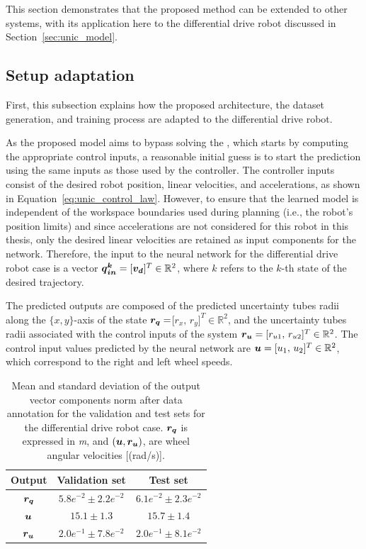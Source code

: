 This section demonstrates that the proposed method can be extended to other systems, with its application here to the differential drive robot discussed in Section~\ref{sec:unic_model}.

\subsection{Setup adaptation}\label{sec:setup_adaptation}

First, this subsection explains how the proposed architecture, the dataset generation, and training process are adapted to the differential drive robot.

As the proposed model aims to bypass solving the , which starts by computing the appropriate control inputs, a reasonable initial guess is to start the prediction using the same inputs as those used by the controller.
The  controller inputs consist of the desired robot position, linear velocities, and accelerations, as shown in Equation~\ref{eq:unic_control_law}. 
However, to ensure that the learned model is independent of the workspace boundaries used during planning (i.e., the robot's position limits) and since accelerations are not considered for this robot in this thesis, only the desired linear velocities are retained as input components for the network.
Therefore, the input to the neural network for the differential drive robot case is a vector $\boldsymbol{\boldsymbol{q}_{in}^k} = [\boldsymbol{v_d}]^T \in \mathbb{R}^2$, where $k$ refers to the $k$-th state of the desired trajectory.

The predicted outputs are composed of the predicted uncertainty tubes radii along the $\{x,y\}$-axis of the state $\boldsymbol{r_q}=$[$r_{x},\,r_{y}]^T \in \mathbb{R}^2$, and the uncertainty tubes radii associated with the control inputs of the system $\boldsymbol{r_u} = [r_{u1},\,r_{u2}]^T \in \mathbb{R}^2$.
The control input values predicted by the neural network are $\boldsymbol{u} = [u_1 ,\, u_2]^T \in \mathbb{R}^2$, which correspond to the right and left wheel speeds.

\begin{table}[htp]
    \centering
    \begin{tabular}{ | c | c || c |}
    \hline
      \textbf{Output}  & \textbf{Validation set}  & \textbf{Test set} \\ \hline
    $\boldsymbol{r_q}$ & $5.8e^{-2} \pm 2.2e^{-2}$ & $6.1e^{-2} \pm 2.3e^{-2}$ \\ \hline
    $\boldsymbol{u}$ & $15.1 \pm 1.3$ & $15.7 \pm 1.4$ \\ \hline
    $\boldsymbol{r_u}$ & $2.0e^{-1} \pm 7.8e^{-2}$ & $2.0e^{-1} \pm 8.1e^{-2}$ \\ \hline
\end{tabular}
\caption{
Mean and standard deviation of the output vector components norm after data annotation for the validation and test sets for the differential drive robot case.
$\boldsymbol{r_q}$ is expressed in \emph{m}, and $(\boldsymbol{u}, \boldsymbol{r_u})$, are wheel angular velocities [(rad/s)].}
 \label{tab:datas_stats_unic}
\end{table}

